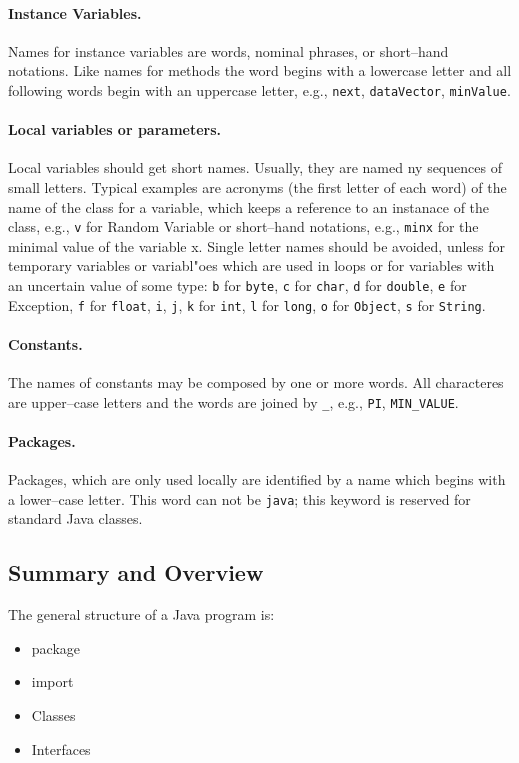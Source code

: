 \paragraph{Instance Variables.} Names for instance variables are
  words, nominal phrases, or short--hand notations. Like names for
  methods the word begins with a lowercase letter and all following
  words begin with an uppercase letter, e.g., \verb|next|,
  \verb|dataVector|,
\verb|minValue|.

\paragraph{Local variables or parameters.} Local variables should get
  short  names. Usually, they are named ny sequences of small
  letters. Typical examples are acronyms (the first letter of each
  word) of the name of the class for a variable, which keeps a
  reference to an instanace of the class, e.g., \verb|v| for Random
  Variable or short--hand notations, e.g., \verb|minx| for the minimal
  value of the variable x. Single letter names should be avoided,
  unless for temporary variables or variabl"oes which are used in
  loops or for variables with an uncertain value of some type:
\verb|b| for \verb|byte|, \verb|c| for \verb|char|, \verb|d| for
  \verb|double|, \verb|e| for Exception, \verb|f| for \verb|float|,
  \verb|i|,
\verb|j|, \verb|k| for \verb|int|, \verb|l| for \verb|long|, \verb|o|
  for \verb|Object|, \verb|s| for \verb|String|.

\paragraph{Constants.} The names of constants may be composed by one
  or more words. All characteres are upper--case letters and the words
  are joined by \verb|_|, e.g., \verb|PI|,  \verb|MIN_VALUE|.

\paragraph{Packages.} Packages, which are only used locally are
  identified by a name which begins with a lower--case letter. This
  word can not be \verb|java|; this keyword is reserved for
  standard Java classes.



\subsection{Summary and Overview}
The general structure of a Java program is:
\begin{itemize}
\item package
\item import
\item Classes
\item Interfaces
\end{itemize}

